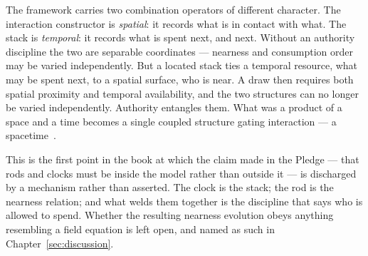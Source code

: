 \begin{remark}
\label{rmk:spacetime}
The framework carries two combination operators of different character.
The interaction constructor is \emph{spatial}: it records what is in
contact with what.  The stack is \emph{temporal}: it records what is spent
next, and next.  Without an authority discipline the two are separable
coordinates --- nearness and consumption order may be varied
independently.  But a located stack ties a temporal resource, what may be
spent next, to a spatial surface, who is near.  A draw then requires both
spatial proximity and temporal availability, and the two structures can no
longer be varied independently.  Authority entangles them.  What was a
product of a space and a time becomes a single coupled structure gating
interaction --- a spacetime~\cite[\S13]{CE}.
\end{remark}

This is the first point in the book at which the claim made in the Pledge
--- that rods and clocks must be inside the model rather than outside it
--- is discharged by a mechanism rather than asserted.  The clock is the
stack; the rod is the nearness relation; and what welds them together is
the discipline that says who is allowed to spend.  Whether the resulting
nearness evolution obeys anything resembling a field equation is left
open, and named as such in Chapter~\ref{sec:discussion}.

